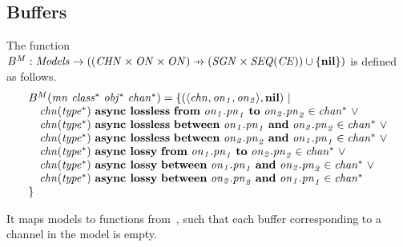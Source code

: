 \subsection{Buffers}
The function~$B^M : \Models \to ((\ChannelNames \times \ObjectNames \times \ObjectNames) \pfun (\SignalNames \times {\it SEQ}(\ConstantExpressions)) \cup \{\nil\})$ is defined as follows.
%
\[
\begin{array}{l}
B^M(\it{mn}~\it{class^*}~\it{obj^*}~\it{chan^*}) =
\{(\langle \it{chn}, \it{on}_1, \it{on}_2 \rangle, \textbf{nil}) ~ | \\
\quad \it{chn}(\it{type^*})~\textbf{async lossless}~\textbf{from}~\it{on}_1.\it{pn}_1~\textbf{to}~\it{on}_2.\it{pn}_2 \in \it{chan^*}
\ \vee \\
\quad \it{chn}(\it{type^*})~\textbf{async lossless}~\textbf{between}~\it{on}_1.\it{pn}_1~\textbf{and}~\it{on}_2.\it{pn}_2 \in \it{chan^*}
\ \vee \\
\quad \it{chn}(\it{type^*})~\textbf{async lossless}~\textbf{between}~\it{on}_2.\it{pn}_2~\textbf{and}~\it{on}_1.\it{pn}_1 \in \it{chan^*}
\ \vee \\
\quad \it{chn}(\it{type^*})~\textbf{async lossy}~\textbf{from}~\it{on}_1.\it{pn}_1~\textbf{to}~\it{on}_2.\it{pn}_2 \in \it{chan^*}
\ \vee \\
\quad \it{chn}(\it{type^*})~\textbf{async lossy}~\textbf{between}~\it{on}_1.\it{pn}_1~\textbf{and}~\it{on}_2.\it{pn}_2 \in \it{chan^*}
\ \vee \\
\quad \it{chn}(\it{type^*})~\textbf{async lossy}~\textbf{between}~\it{on}_2.\it{pn}_2~\textbf{and}~\it{on}_1.\it{pn}_1 \in \it{chan^*} \\
\}
\end{array}
\]

\noindent
It maps models to functions from~\Buf, such that each buffer corresponding to a channel in the model is empty.